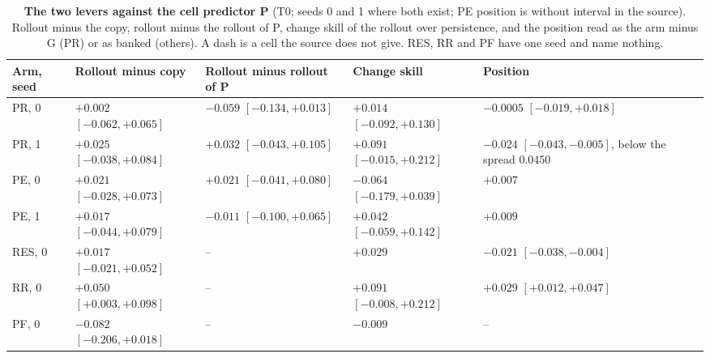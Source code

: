 \documentclass[10pt,twocolumn]{article}
\theoremstyle{remark}
\newcommand{\tier}[1]{\textsc{\small #1}}
\begin{document}
\begin{table}[!tp]
\centering
\caption{\textbf{The two levers against the cell predictor P} (\tier{T0}; seeds 0 and 1 where both exist; PE position is without interval in the source). Rollout minus the copy, rollout minus the rollout of P, change skill of the rollout over persistence, and the position read as the arm minus G (PR) or as banked (others). A dash is a cell the source does not give. RES, RR and PF have one seed and name nothing.}
\label{tab:levers}
\scriptsize
\begin{tabularx}{\textwidth}{@{}l>{\raggedright\arraybackslash}X>{\raggedright\arraybackslash}X>{\raggedright\arraybackslash}X>{\raggedright\arraybackslash}X@{}}
\toprule
Arm, seed & Rollout minus copy & Rollout minus rollout of P & Change skill & Position \\
\midrule
PR, 0 & $+0.002$ $[-0.062,+0.065]$ & $-0.059$ $[-0.134,+0.013]$ & $+0.014$ $[-0.092,+0.130]$ & $-0.0005$ $[-0.019,+0.018]$ \\
PR, 1 & $+0.025$ $[-0.038,+0.084]$ & $+0.032$ $[-0.043,+0.105]$ & $+0.091$ $[-0.015,+0.212]$ & $-0.024$ $[-0.043,-0.005]$, below the spread 0.0450 \\
PE, 0 & $+0.021$ $[-0.028,+0.073]$ & $+0.021$ $[-0.041,+0.080]$ & $-0.064$ $[-0.179,+0.039]$ & $+0.007$ \\
PE, 1 & $+0.017$ $[-0.044,+0.079]$ & $-0.011$ $[-0.100,+0.065]$ & $+0.042$ $[-0.059,+0.142]$ & $+0.009$ \\
RES, 0 & $+0.017$ $[-0.021,+0.052]$ & -- & $+0.029$ & $-0.021$ $[-0.038,-0.004]$ \\
RR, 0 & $+0.050$ $[+0.003,+0.098]$ & -- & $+0.091$ $[-0.008,+0.212]$ & $+0.029$ $[+0.012,+0.047]$ \\
PF, 0 & $-0.082$ $[-0.206,+0.018]$ & -- & $-0.009$ & -- \\
\bottomrule
\end{tabularx}
\end{table}
\end{document}
